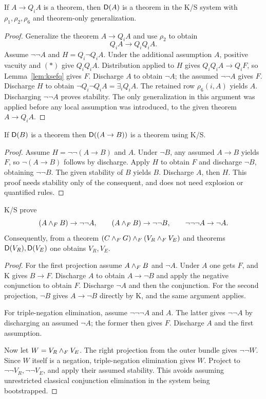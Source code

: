 \begin{lemma}
\label{lem:ksvstable}
If $A\to Q_iA$ is a theorem, then $\mathsf{D}(A)$ is a theorem in the K/S system
with $\rho_1,\rho_2,\rho_6$ and theorem-only generalization.
\end{lemma}
\begin{proof}
Generalize the theorem $A\to Q_iA$ and use $\rho_2$ to obtain
\[
 Q_iA\to Q_iQ_iA. \tag{*}
\]
Assume $\neg\neg A$ and $H=Q_i\neg Q_iA$. Under the additional assumption
$A$, positive vacuity and $(*)$ give $Q_iQ_iA$. Distribution applied to
$H$ gives $Q_iQ_iA\to Q_iF$, so Lemma~\ref{lem:ksefq} gives $F$.
Discharge $A$ to obtain $\neg A$; the assumed $\neg\neg A$ gives $F$.
Discharge $H$ to obtain $\neg Q_i\neg Q_iA=\exists_iQ_iA$. The retained
row $\rho_6(i,A)$ yields $A$. Discharging $\neg\neg A$ proves stability.
The only generalization in this argument was applied before any local
assumption was introduced, to the given theorem $A\to Q_iA$.
\end{proof}

\begin{lemma}
\label{lem:ksimpstable}
If $\mathsf{D}(B)$ is a theorem then $\mathsf{D}((A\to B))$ is a theorem using K/S.
\end{lemma}
\begin{proof}
Assume $H=\neg\neg(A\to B)$ and $A$. Under $\neg B$, any assumed
$A\to B$ yields $F$, so $\neg(A\to B)$ follows by discharge. Apply
$H$ to obtain $F$ and discharge $\neg B$, obtaining $\neg\neg B$.
The given stability of $B$ yields $B$. Discharge $A$, then $H$.
This proof needs stability only of the consequent, and does not need
explosion or quantified rules.
\end{proof}

\begin{lemma}
\label{lem:ksbundle}
K/S prove
\[
 (A\mathbin{\wedge_F} B)\to\neg\neg A,
 \qquad
 (A\mathbin{\wedge_F} B)\to\neg\neg B,
 \qquad
 \neg\neg\neg A\to\neg A.
\]
Consequently, from a theorem
$(C\mathbin{\wedge_F} G)\mathbin{\wedge_F}(V_R\mathbin{\wedge_F} V_E)$ and theorems
$\mathsf{D}(V_R),\mathsf{D}(V_E)$ one obtains $V_R,V_E$.
\end{lemma}
\begin{proof}
For the first projection assume $A\mathbin{\wedge_F} B$ and $\neg A$. Under $A$
one gets $F$, and K gives $B\to F$. Discharge $A$ to obtain
$A\to\neg B$ and apply the negative conjunction to obtain $F$.
Discharge $\neg A$ and then the conjunction. For the second projection,
$\neg B$ gives $A\to\neg B$ directly by K, and the same argument applies.

For triple-negation elimination, assume $\neg\neg\neg A$ and $A$.
The latter gives $\neg\neg A$ by discharging an assumed $\neg A$;
the former then gives $F$. Discharge $A$ and the first assumption.

Now let $W=V_R\mathbin{\wedge_F} V_E$. The right projection from the outer bundle
gives $\neg\neg W$. Since $W$ itself is a negation, triple-negation
elimination gives $W$. Project to $\neg\neg V_R,\neg\neg V_E$, and
apply their assumed stability. This avoids assuming unrestricted
classical conjunction elimination in the system being bootstrapped.
\end{proof}

